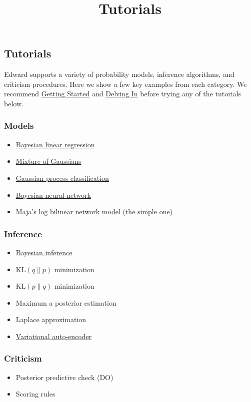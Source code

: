 \title{Tutorials}

\subsection{Tutorials}

Edward supports a variety of probability models, inference
algorithms, and criticism procedures. Here we show a few key examples from each
category. We recommend \href{getting-started.html}{Getting Started} and 
\href{delving-in.html}{Delving In} before trying any of the tutorials below.

\subsubsection{Models}

\begin{itemize}
\item \href{tut_bayesian_linear_regression.html}{Bayesian linear regression}
\item \href{tut_mixture_gaussian.html}{Mixture of Gaussians}
\item \href{tut_gp_classification.html}{Gaussian process classification}
\item \href{tut_bayesian_nn.html}{Bayesian neural network}
\item Maja's log bilinear network model (the simple one)
\end{itemize}

\subsubsection{Inference}

\begin{itemize}
  \item \href{tut_bayesian_inference.html}{Bayesian inference}
  \item $\text{KL}(q\|p)$ minimization
  \item $\text{KL}(p\|q)$ minimization
  \item Maximum a posterior estimation 
  \item Laplace approximation 
  \item
  \href{https://github.com/blei-lab/edward/blob/master/examples/convolutional_vae.py}{Variational
  auto-encoder}
\end{itemize}

\subsubsection{Criticism}

\begin{itemize}
  \item Posterior predictive check (DO)
  \item Scoring rules
\end{itemize}
